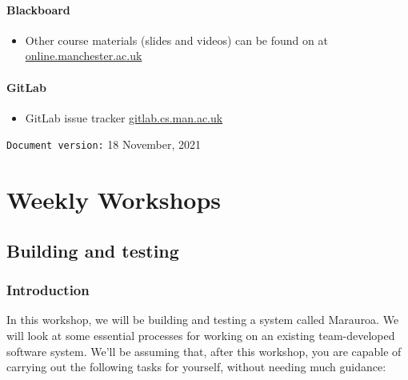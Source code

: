 \documentclass[
]{book}
\providecommand{\tightlist}{%
  \setlength{\itemsep}{0pt}\setlength{\parskip}{0pt}}
\begin{document}
\hypertarget{blackboard}{%
\subsection{Blackboard}\label{blackboard}}

\begin{itemize}
\tightlist
\item
  Other course materials (slides and videos) can be found on at \href{https://online.manchester.ac.uk/}{online.manchester.ac.uk}
\end{itemize}

\hypertarget{gitlab}{%
\subsection{GitLab}\label{gitlab}}

\begin{itemize}
\tightlist
\item
  GitLab issue tracker \href{https://gitlab.cs.man.ac.uk/}{gitlab.cs.man.ac.uk}
\end{itemize}

























\texttt{Document\ version:} 18 November, 2021

\hypertarget{part-weekly-workshops}{%
\part{Weekly Workshops}\label{part-weekly-workshops}}

\hypertarget{building}{%
\chapter{Building and testing}\label{building}}

\hypertarget{Introduction}{%
\section{Introduction}\label{Introduction}}

In this workshop, we will be building and testing a system called Marauroa. We will look at some essential processes for working on an existing team-developed software system. We'll be assuming that, after this workshop, you are capable of carrying out the following tasks for yourself, without needing much guidance:
\end{document}
